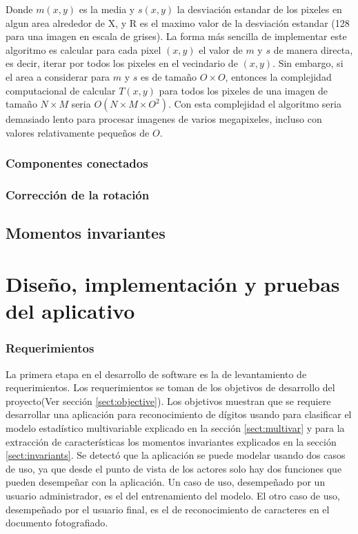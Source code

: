 \documentclass[a4paper, 11pt, oneside]{report}
\begin{document}
Donde $m(x,y)$ es la media y $s(x,y)$ la desviación estandar de los pixeles en algun area alrededor de X, y R es el maximo valor de la desviación estandar (128 para una imagen en escala de grises). La forma más sencilla de implementar este algoritmo es calcular para cada pixel $(x,y)$ el valor de $m$ y $s$ de manera directa, es decir, iterar por todos los pixeles en el vecindario de $(x,y)$. Sin embargo, si el area a considerar para $m$ y $s$ es de tamaño $O \times O$, entonces la complejidad computacional de calcular $T(x,y)$ para todos los pixeles de una imagen de tamaño $N \times M$ seria $O(N \times M \times O^{2})$. Con esta complejidad el algoritmo seria demasiado lento para procesar imagenes de varios megapixeles, incluso con valores relativamente pequeños de $O$.

\subsection{Componentes conectados}

\subsection{Corrección de la rotación}

\section{Momentos invariantes}

\chapter{Diseño, implementación y pruebas del aplicativo}
\label{chap:ingSw}

\subsection{Requerimientos}
La primera etapa en el desarrollo de software es la de levantamiento de requerimientos. Los requerimientos se toman de los objetivos de desarrollo del proyecto(Ver sección \ref{sect:objective}). Los objetivos muestran que se requiere desarrollar una aplicación para reconocimiento de dígitos usando para clasificar el modelo estadístico multivariable explicado en la sección \ref{sect:multivar} y para la extracción de características los momentos invariantes explicados en la sección \ref{sect:invariants}.\newline \newline
Se detectó que la aplicación se puede modelar usando dos casos de uso, ya que desde el punto de vista de los actores solo hay dos funciones que pueden desempeñar con la aplicación. Un caso de uso, desempeñado por un usuario administrador, es el del entrenamiento del modelo. El otro caso de uso, desempeñado por el usuario final, es el de reconocimiento de caracteres en el documento fotografiado.
\end{document}
